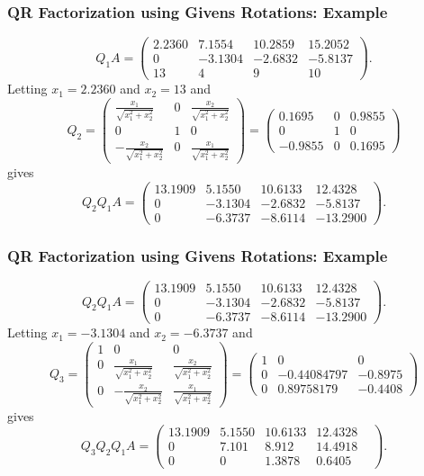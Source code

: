 \documentclass{beamer}
\begin{document}
\begin{frame}\frametitle{QR Factorization using Givens Rotations: Example}
	\[
		Q_1 A = 
			\begin{pmatrix}
    			2.2360 & 7.1554 & 10.2859 & 15.2052 \\
				0 & -3.1304 & -2.6832 & -5.8137 \\
				13 & 4 & 9 & 10
			\end{pmatrix}.
	\]
	Letting $x_1=2.2360$ and $x_2=13$ and 
	\[
		Q_2 = 
			\begin{pmatrix}
 			\frac{x_1}{\sqrt{x_1^2+x_2^2}} & 0 & \frac{x_2}{\sqrt{x_1^2+x_2^2}} \\
 			0 & 1 & 0 \\
 			-\frac{x_2}{\sqrt{x_1^2+x_2^2}} & 0 & \frac{x_1}{\sqrt{x_1^2+x_2^2}} 
 			\end{pmatrix}
 			=
 			\begin{pmatrix}
				0.1695 & 0 & 0.9855 \\
				0  & 1 & 0 \\
				-0.9855 & 0 & 0.1695
 			\end{pmatrix}
	\]
	gives
	\[
		Q_2 Q_1 A = 
			\begin{pmatrix}
				13.1909 & 5.1550 & 10.6133 & 12.4328 \\
				0 & -3.1304 & -2.6832 & -5.8137 \\
				0  & -6.3737 & -8.6114 & -13.2900
			\end{pmatrix}.
	\]
\end{frame}

\begin{frame}\frametitle{QR Factorization using Givens Rotations: Example}
	\[
		Q_2 Q_1 A = 
			\begin{pmatrix}
				13.1909 & 5.1550 & 10.6133 & 12.4328 \\
				0 & -3.1304 & -2.6832 & -5.8137 \\
				0  & -6.3737 & -8.6114 & -13.2900
			\end{pmatrix}.
	\]
	Letting $x_1=-3.1304$ and $x_2=-6.3737$ and 
	\[
		Q_3 = 
			\begin{pmatrix}
				1 & 0 & 0 \\
	 			0 &\frac{x_1}{\sqrt{x_1^2+x_2^2}} & \frac{x_2}{\sqrt{x_1^2+x_2^2}} \\
 				0 & -\frac{x_2}{\sqrt{x_1^2+x_2^2}} & \frac{x_1}{\sqrt{x_1^2+x_2^2}} 
 			\end{pmatrix}
 			=
 			\begin{pmatrix}
				1 & 0 & 0 \\
				0 & -0.44084797 & -0.8975 \\
				0 & 0.89758179 & -0.4408		
 			\end{pmatrix}
	\]
	gives
	\[
		Q_3 Q_2 Q_1 A = 
			\begin{pmatrix}
				13.1909 & 5.1550 & 10.6133 & 12.4328 & \\
				0 & 7.101 & 8.912 & 14.4918 \\
				0 & 0  & 1.3878 & 0.6405  		
   			\end{pmatrix}.
	\]
\end{frame}
\end{document}

